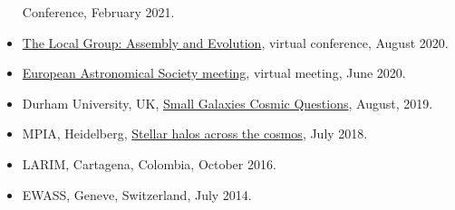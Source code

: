 \documentclass[14pt]{article}
\begin{document}
\begin{itemize}
  Conference, February 2021. 
\item  \href{https://www.stsci.edu/contents/events/stsci/2020/april/the-local-group-assembly-and-evolution?page=2&filterUUID=6fedb8a7-}{The Local Group: Assembly and Evolution}, virtual conference, August 2020.
\item \href{https://eas.unige.ch/EAS2020/}{European Astronomical Society meeting}, virtual meeting, June 2020.
\item Durham University, UK, \href{http://astro.dur.ac.uk/cosmodwarfs/}{Small Galaxies Cosmic Questions}, August, 2019.
\item MPIA, Heidelberg, \href{http://www.mpia.de/homes/stellarhalos2018-loc/sh2018/index.html}{Stellar halos across the cosmos}, July 2018.
\item LARIM, Cartagena, Colombia, October 2016.
\item EWASS, Geneve, Switzerland, July 2014.
\end{itemize}
  
\end{document}
